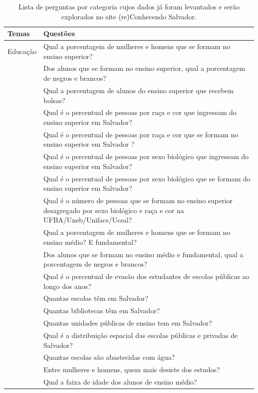 \documentclass[
]{book}
\begin{document}
\begin{table}

\caption{\label{tab:quadroperguntasapend}Lista de perguntas por categoria cujos dados já foram levantados e serão explorados no site (re)Conhecendo Salvador.}
\centering
\begin{tabular}[t]{l|l}
\hline
Temas & Questões\\
\hline
Educação & Qual a porcentagem de mulheres e homens que se formam no ensino superior?\\
\hline
 & Dos alunos que se formam no ensino superior, qual a porcentagem de negros e brancos?\\
\hline
 & Qual a porcentagem de alunos do ensino superior que recebem bolsas?\\
\hline
 & Qual é o percentual de pessoas por raça e cor que ingressam do ensino superior em Salvador?\\
\hline
 & Qual é o percentual de pessoas por raça e cor que se formam no ensino superior em Salvador ?\\
\hline
 & Qual é o percentual de pessoas por sexo biológico que ingressam do ensino superior em Salvador?\\
\hline
 & Qual é o percentual de pessoas por sexo biológico que se formam do ensino superior em Salvador?\\
\hline
 & Qual é o número de pessoas que se formam no ensino superior desagregado por sexo biológico e raça e cor na UFBA/Uneb/Unifacs/Ucsal?\\
\hline
 & Qual a porcentagem de mulheres e homens que se formam no ensino médio? E fundamental?\\
\hline
 & Dos alunos que se formam no ensino médio e fundamental, qual a porcentagem de negros e brancos?\\
\hline
 & Qual é o percentual de evasão dos estudantes de escolas públicas ao longo dos anos?\\
\hline
 & Quantas escolas têm em Salvador?\\
\hline
 & Quantas bibliotecas têm em Salvador?\\
\hline
 & Quantas unidades públicas de ensino tem em Salvador?\\
\hline
 & Qual é a distribuição espacial das escolas públicas e privadas de Salvador?\\
\hline
 & Quantas escolas são abastecidas com água?\\
\hline
 & Entre mulheres e homens, quem mais desiste dos estudos?\\
\hline
 & Qual a faixa de idade dos alunos de ensino médio?\\

\end{tabular}
\end{table}
\end{document}
